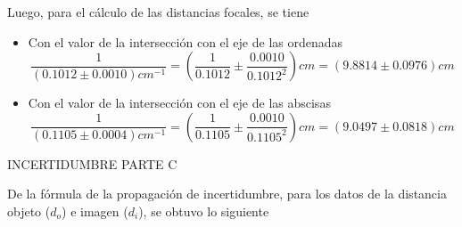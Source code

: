 \documentclass[a4paper, 10pt]{article}
\begin{document}
	Luego, para el cálculo de las distancias focales, se tiene
	\begin{itemize}
		\item  Con el valor de la intersección con el eje de las ordenadas
		$$\dfrac{1}{(0.1012\pm 0.0010) cm^{-1}}=\left(\dfrac{1}{0.1012}\pm\dfrac{0.0010}{0.1012^2}\right)cm=(9.8814\pm0.0976)cm$$
		
		\item  Con el valor de la intersección con el eje de las abscisas
		$$\dfrac{1}{(0.1105\pm 0.0004) cm^{-1}}=\left(\dfrac{1}{0.1105}\pm\dfrac{0.0010}{0.1105^2}\right)cm=(9.0497\pm 0.0818)cm$$
	\end{itemize}
	
	\newpage
	INCERTIDUMBRE PARTE C
	
	De la fórmula de la propagación de incertidumbre, para los datos de la distancia objeto ($d_o$) e imagen ($d_i$), se obtuvo lo siguiente
\end{document}
